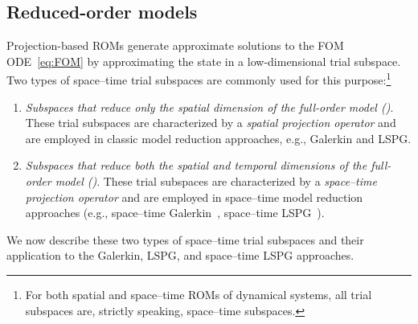 \documentclass[3p,computermodern,10pt]{elsarticle}
\begin{document}
\subsection{Reduced-order models}
Projection-based ROMs generate approximate solutions to the FOM
	ODE~\eqref{eq:FOM} by approximating the state in a low-dimensional trial
	subspace. Two types of space--time trial subspaces are commonly used for
	this purpose:\footnote{For both spatial and space--time ROMs of dynamical systems, all trial subspaces are, strictly speaking, space--time subspaces.} 
\begin{enumerate} 
	\item \textit{Subspaces that reduce only the spatial dimension of the full-order
		model (\spatialAcronym)}. These trial subspaces are characterized by a \textit{spatial projection operator} and are employed in classic model reduction approaches, e.g., Galerkin and LSPG. %
	\item \textit{Subspaces that reduce both the spatial and temporal dimensions of the full-order
		model (\spaceTimeAcronym)}.
These trial subspaces are characterized by a \textit{space--time projection operator} and are employed in space--time 
model reduction approaches (e.g., space--time Galerkin~\cite{benner_st}, space--time LSPG~\cite{choi_stlspg}). 
\end{enumerate}
 We now describe these two types of space--time trial subspaces and their
	application to the Galerkin, LSPG, and space--time LSPG approaches. 
\end{document}

